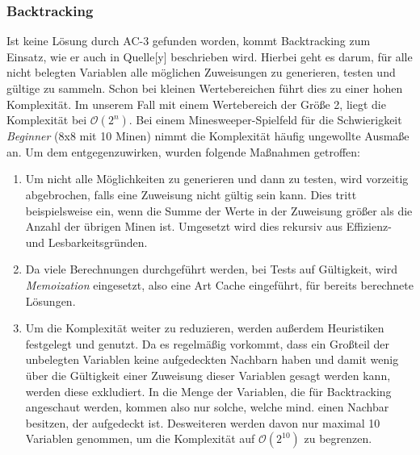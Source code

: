 \subsubsection{Backtracking}

Ist keine Lösung durch AC-3 gefunden worden, kommt Backtracking zum Einsatz, wie er auch in Quelle[y] beschrieben wird. Hierbei geht es darum,
für alle nicht belegten Variablen alle möglichen Zuweisungen zu generieren, testen und gültige zu sammeln. Schon bei kleinen Wertebereichen
führt dies zu einer hohen Komplexität. Im unserem Fall mit einem Wertebereich der Größe 2, liegt die Komplexität bei $\mathcal{O}(2^n)$.
Bei einem Minesweeper-Spielfeld für die Schwierigkeit \textit{Beginner} (8x8 mit 10 Minen) nimmt die Komplexität häufig ungewollte Ausmaße an.
Um dem entgegenzuwirken, wurden folgende Maßnahmen getroffen:
\begin{enumerate}
    \item Um nicht alle Möglichkeiten zu generieren und dann zu testen, wird vorzeitig abgebrochen, falls eine Zuweisung nicht gültig sein
    kann. Dies tritt beispielsweise ein, wenn die Summe der Werte in der Zuweisung größer als die Anzahl der übrigen Minen ist. Umgesetzt wird
    dies rekursiv aus Effizienz- und Lesbarkeitsgründen.
    \item Da viele Berechnungen durchgeführt werden, bei Tests auf Gültigkeit, wird \textit{Memoization} eingesetzt, also eine Art Cache eingeführt,
    für bereits berechnete Lösungen. 
    \item Um die Komplexität weiter zu reduzieren, werden außerdem Heuristiken festgelegt und genutzt. Da es regelmäßig vorkommt, dass ein
    Großteil der unbelegten Variablen keine aufgedeckten Nachbarn haben und damit wenig über die Gültigkeit einer Zuweisung dieser Variablen
    gesagt werden kann, werden diese exkludiert. In die Menge der Variablen, die für Backtracking angeschaut werden, kommen also nur solche,
    welche mind. einen Nachbar besitzen, der aufgedeckt ist. Desweiteren werden davon nur maximal 10 Variablen genommen, um die Komplexität
    auf $\mathcal{O}(2^{10})$ zu begrenzen.
\end{enumerate}

